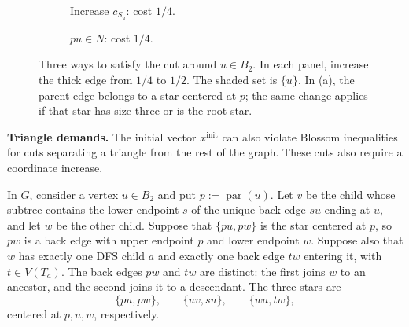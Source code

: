 \documentclass[11pt]{amsart}
\newcommand{\1}{\mathbbm{1}}
\begin{document}
\begin{figure}[H]
\begin{subfigure}[t]{.32\textwidth}
\caption{Increase $c_{S_u}$: cost $1/4$.}
\end{subfigure}\hfill
\begin{subfigure}[t]{.32\textwidth}\centering
{}
\caption{$pu\in N$: cost $1/4$.}
\end{subfigure}
\caption{Three ways to satisfy the cut around $u\in B_2$.
In each panel, increase the thick edge from $1/4$ to $1/2$.
The shaded set is $\{u\}$. In (a), the parent edge belongs to a
star centered at $p$; the same change applies if that star has
size three or is the root star.}
\label{fig:quartic-changes}
\end{figure}


\textbf{Triangle demands.}
The initial vector $x^{\mathrm{init}}$ can also violate Blossom
inequalities for cuts separating a triangle from the rest of the
graph. These cuts also require a coordinate increase.

In $G$, consider a vertex $u\in B_2$ and put $p:=\operatorname{par}(u)$.
Let $v$ be the child whose subtree contains the lower endpoint
$s$ of the unique back edge $su$ ending at $u$, and let $w$ be
the other child. Suppose that $\{pu,pw\}$ is the star centered
at $p$, so $pw$ is a back edge with upper endpoint $p$ and
lower endpoint $w$.
Suppose also that $w$ has exactly one DFS child $a$ and exactly one
back edge $tw$ entering it, with $t\in V(T_a)$.
The back edges $pw$ and $tw$ are distinct: the first joins $w$
to an ancestor, and the second joins it to a descendant.
The three stars are
\[
    \{pu,pw\},\qquad
    \{uv,su\},\qquad
    \{wa,tw\},
\]
centered at $p,u,w$, respectively.
\end{document}
